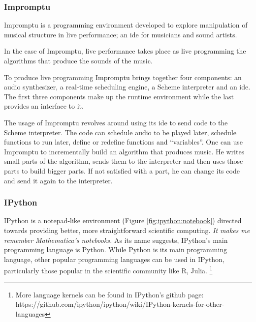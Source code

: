 \documentclass{./llncs2e/llncs}
\begin{document}
\subsubsection{Impromptu\cite{sorensen2005impromptu}\cite{sorensen2010programming}}
	Impromptu is a programming environment developed to explore manipulation of musical structure in live performance; an \ac{ide} for musicians and sound artists.
	
	In the case of Impromptu, live performance takes place as live programming the algorithms that produce the sounds of the music.
	
	To produce live programming Impromptu brings together four components: an audio synthesizer, a real-time scheduling engine, a Scheme interpreter and an \ac{ide}. 
	The first three components make up the runtime environment while the last provides an interface to it. 
	
	The usage of Impromptu revolves around using its \ac{ide} to send code to the Scheme interpreter. 
	The code can schedule audio to be played later, schedule functions to run later, define or redefine functions and ``variables''. 
	One can use Impromptu to incrementally build an algorithm that produces music. 
	He writes small parts of the algorithm, sends them to the interpreter and then uses those parts to build bigger parts. 
	If not satisfied with a part, he can change its code and send it again to the interpreter.
	
	
\subsubsection{IPython\cite{PER-GRA:2007}}
	IPython is a notepad-like environment (Figure \ref{fig:ipython:notebook}) directed towards providing better, more straightforward scientific computing. \emph{It makes me remember Mathematica's notebooks.} As its name suggests, IPython's main programming language is Python. 
	While Python is its main programming language, other popular programming languages can be used in IPython, particularly those popular in the scientific community like R, Julia. \footnote{More language kernels can be found in IPython's github page: https://github.com/ipython/ipython/wiki/IPython-kernels-for-other-languages}
	
\end{document}
